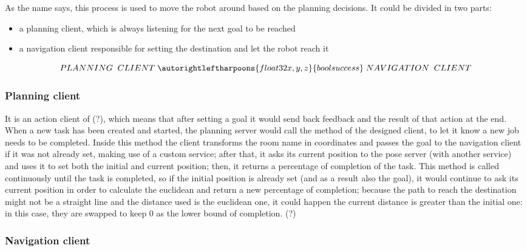 As the name says, this process is used to move the robot around based on the planning decisions. It could be divided in two parts:

\begin{itemize}
    \item a planning client, which is always listening for the next goal to be reached
    \item a navigation client responsible for setting the destination and let the robot reach it
\end{itemize}

$$  
    PLANNING \;\; CLIENT \; 
        \autorightleftharpoons{float32 x, y, z}{bool success} \;
    NAVIGATION \;\; CLIENT
$$ 
    

\subsubsection{Planning client}


It is an action client of  (?), which means that after setting a goal it would send back feedback and the result of that action at the end. When a new task has been created and started, the planning server would call the  method of the designed client, to let it know a new job needs to be completed.
Inside this method the client transforms the room name in coordinates and passes the goal to the navigation client if it was not already set, making use of a custom service; after that, it asks its current position to the pose server (with another service) and uses it to set both the initial and current position; then, it returns a percentage of completion of the task. This method is called continuously until the task is completed, so if the initial position is already set (and as a result also the goal), it would continue to ask its current position in order to calculate the euclidean and return a new percentage of completion; because the path to reach the destination might not be a straight line and the distance used is the euclidean one, it could happen the current distance is greater than the initial one: in this case, they are swapped to keep 0 as the lower bound of completion. (?)

\subsubsection{Navigation client}

